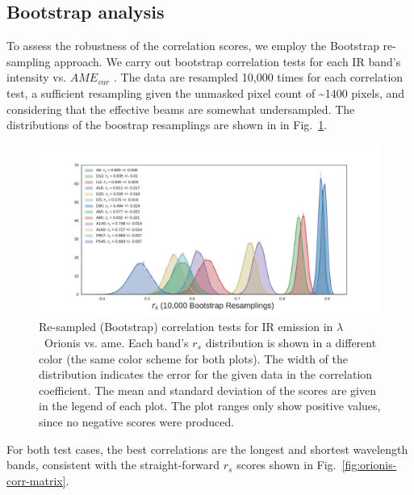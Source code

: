     \subsection{Bootstrap analysis}
        To assess the robustness of the correlation scores, we employ the Bootstrap re-sampling approach. We carry out bootstrap correlation tests for each IR band's intensity vs. $AME_{var}$ . The data are resampled 10,000 times for each correlation test, a sufficient resampling given the unmasked pixel count of \textasciitilde{}1400 pixels, and considering that the effective beams are somewhat undersampled.  The distributions of the boostrap resamplings are shown in in Fig.~\ref{fig:bootstrap_vs_AME}.
            \begin{figure}
              \includegraphics[width=\textwidth,trim={3cm 0.25cm 2.5cm 1cm},clip]{../Plots/ch_lori/bootstrap_vs_AME_spearman_i10000.pdf}
              \centering
              \caption{Re-sampled (Bootstrap) correlation tests for IR emission in $\lambda$~Orionis vs. \acrshort{ame}. Each band's $r_{s}$ distribution is shown in a different color (the same color scheme for both plots). The width of the distribution indicates the error for the given data in the correlation coefficient. The mean and standard deviation of the scores are given in the legend of each plot. The plot ranges only show positive values, since no negative scores were produced. }
              \label{fig:bootstrap_vs_AME}
            \end{figure}
        For both test cases, the best correlations are the longest and shortest wavelength bands, consistent with the straight-forward $r_{s}$ scores shown in Fig.~\ref{fig:orionis-corr-matrix}.

